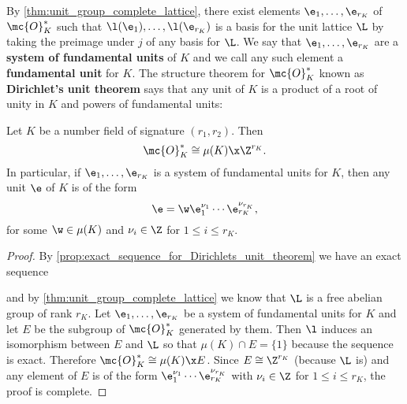       By \cref{thm:unit_group_complete_lattice}, there exist elements $\e_{1},\ldots,\e_{r_{K}}$ of $\mc{O}_{K}^{\ast}$ such that $\l(\e_{1}),\ldots,\l(\e_{r_{K}})$ is a basis for the unit lattice $\L$ by taking the preimage under $j$ of any basis for $\L$. We say that $\e_{1},\ldots,\e_{r_{K}}$ are a \textbf{system of fundamental units} of $K$ and we call any such element a \textbf{fundamental unit} for $K$. The structure theorem for $\mc{O}_{K}^{\ast}$ known as \textbf{Dirichlet's unit theorem} says that any unit of $K$ is a product of a root of unity in $K$ and powers of fundamental units:

      \begin{theorem}
        Let $K$ be a number field of signature $(r_{1},r_{2})$. Then
        \[
          \mc{O}_{K}^{\ast} \cong \mu(K) \x \Z^{r_{K}}.
        \]
        In particular, if $\e_{1},\ldots,\e_{r_{K}}$ is a system of fundamental units for $K$, then any unit $\e$ of $K$ is of the form
        \[
          \e = \w\e_{1}^{\nu_{1}} \cdots \e_{r_{K}}^{\nu_{r_{K}}},
        \]
        for some $\w \in \mu(K)$ and $\nu_{i} \in \Z$ for $1 \le i \le r_{K}$.
      \end{theorem}
      \begin{proof}
        By \cref{prop:exact_sequence_for_Dirichlets_unit_theorem} we have an exact sequence

        \begin{center}
        \end{center}

        and by \cref{thm:unit_group_complete_lattice} we know that $\L$ is a free abelian group of rank $r_{K}$. Let $\e_{1},\ldots,\e_{r_{K}}$ be a system of fundamental units for $K$ and let $E$ be the subgroup of $\mc{O}_{K}^{\ast}$ generated by them. Then $\l$ induces an isomorphism between $E$ and $\L$ so that $\mu(K) \cap E = \{1\}$ because the sequence is exact. Therefore $\mc{O}_{K}^{\ast} \cong \mu(K) \x E$. Since $E \cong \Z^{r_{K}}$ (because $\L$ is) and any element of $E$ is of the form $\e_{1}^{\nu_{1}} \cdots \e_{r_{K}}^{\nu_{r_{K}}}$ with $\nu_{i} \in \Z$ for $1 \le i \le r_{K}$, the proof is complete.
      \end{proof}


